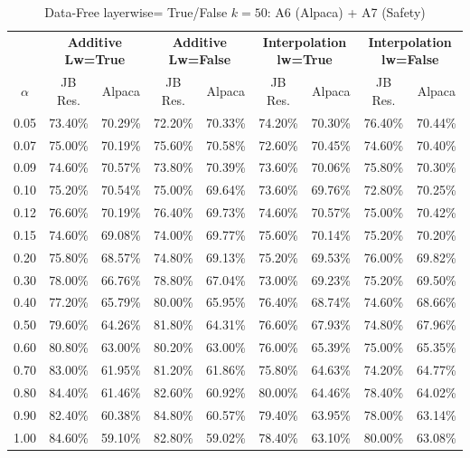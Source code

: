 \begin{table}[h]
\centering
\caption{Data-Free layerwise= True/False $k=50$: A6 (Alpaca) + A7 (Safety)}
\label{tab:res_a6_data_free_50}
\begin{tabular}{c|cc|cc|cc|cc}
\hline
 & \multicolumn{2}{c|}{\textbf{Additive Lw=True}} & \multicolumn{2}{c|}{\textbf{Additive Lw=False}} & \multicolumn{2}{c|}{\textbf{Interpolation lw=True}}& \multicolumn{2}{c}{\textbf{Interpolation lw=False}} \\
$\alpha$ & JB Res. & Alpaca & JB Res. & Alpaca & JB Res. & Alpaca & JB Res. & Alpaca \\
\hline
0.05 & 73.40\% & 70.29\% & 72.20\% & 70.33\% & 74.20\% & 70.30\% & 76.40\% & 70.44\% \\
0.07 & 75.00\% & 70.19\% & 75.60\% & 70.58\% & 72.60\% & 70.45\% & 74.60\% & 70.40\% \\
0.09 & 74.60\% & 70.57\% & 73.80\% & 70.39\% & 73.60\% & 70.06\% & 75.80\% & 70.30\% \\
0.10 & 75.20\% & 70.54\% & 75.00\% & 69.64\% & 73.60\% & 69.76\% & 72.80\% & 70.25\% \\
0.12 & 76.60\% & 70.19\% & 76.40\% & 69.73\% & 74.60\% & 70.57\% & 75.00\% & 70.42\% \\
0.15 & 74.60\% & 69.08\% & 74.00\% & 69.77\% & 75.60\% & 70.14\% & 75.20\% & 70.20\% \\
0.20 & 75.80\% & 68.57\% & 74.80\% & 69.13\% & 75.20\% & 69.53\% & 76.00\% & 69.82\% \\
0.30 & 78.00\% & 66.76\% & 78.80\% & 67.04\% & 73.00\% & 69.23\% & 75.20\% & 69.50\% \\
0.40 & 77.20\% & 65.79\% & 80.00\% & 65.95\% & 76.40\% & 68.74\% & 74.60\% & 68.66\% \\
0.50 & 79.60\% & 64.26\% & 81.80\% & 64.31\% & 76.60\% & 67.93\% & 74.80\% & 67.96\% \\
0.60 & 80.80\% & 63.00\% & 80.20\% & 63.00\% & 76.00\% & 65.39\% & 75.00\% & 65.35\% \\
0.70 & 83.00\% & 61.95\% & 81.20\% & 61.86\% & 75.80\% & 64.63\% & 74.20\% & 64.77\% \\
0.80 & 84.40\% & 61.46\% & 82.60\% & 60.92\% & 80.00\% & 64.46\% & 78.40\% & 64.02\% \\
0.90 & 82.40\% & 60.38\% & 84.80\% & 60.57\% & 79.40\% & 63.95\% & 78.00\% & 63.14\% \\
1.00 & 84.60\% & 59.10\% & 82.80\% & 59.02\% & 78.40\% & 63.10\% & 80.00\% & 63.08\% \\
\hline
\end{tabular}
\end{table}
\FloatBarrier

